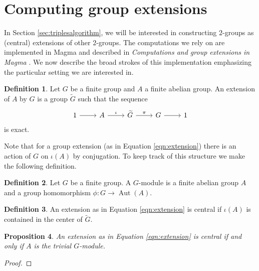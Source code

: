 \documentclass{dcthesis}
\newcommand{\defi}[1]{\textsf{#1}}
\newcommand{\wt}[1]{\widetilde{#1}}
\DeclareMathOperator{\Aut}{Aut}
\newtheorem{prop}{Proposition}[section]
\theoremstyle{definition}
\newtheorem{definition}[prop]{Definition}
\theoremstyle{remark}
\numberwithin{equation}{section}
\numberwithin{figure}{section}
\begin{document}
{  \section{Computing group extensions}{\label{sec:modcoho}
    In Section \ref{sec:triplesalgorithm},
    we will be interested in constructing $2$-groups
    as (central) extensions of other $2$-groups.
    The computations we rely on are implemented in
    \textsf{Magma}
    and described in
    \emph{Computations and group extensions in \textsf{Magma}}
    \cite{magmabook}.
    We now describe the broad strokes of this implementation
    emphasizing the particular setting we are interested in.
    \begin{definition}
      \label{def:groupextension}
      Let $G$ be a finite group
      and $A$ a finite abelian group.
      An \defi{extension of $A$ by $G$} is
      a group $\wt{G}$ such that the sequence
      \begin{equation}
        \label{eqn:extension}
        \begin{tikzcd}
          1\arrow{r}&A\arrow{r}{\iota}&\wt{G}\arrow{r}{\pi}&G\arrow{r}&1
        \end{tikzcd}
      \end{equation}
      is exact.
    \end{definition}
    Note that for a group extension
    (as in Equation \ref{eqn:extension})
    there is an action of $G$ on
    $\iota(A)$ by conjugation.
    To keep track of this structure we make the
    following definition.
    \begin{definition}
      \label{def:Gmodule}
      Let $G$ be a finite group.
      A \defi{$G$-module}
      is a finite abelian group $A$
      and a group homomorphism
      $\phi\colon G\to\Aut(A)$.
    \end{definition}
    \begin{definition}
      \label{def:centralextension}
      An extension as in Equation \ref{eqn:extension}
      is \defi{central}
      if $\iota(A)$ is contained in the center of $\wt{G}$.
    \end{definition}
    \begin{prop}
      \label{prop:centralextensionstrivialGaction}
      An extension as in Equation \ref{eqn:extension}
      is central
      if and only if $A$ is the trivial $G$-module.
    \end{prop}
    \begin{proof}

\end{proof}}}
\end{document}
